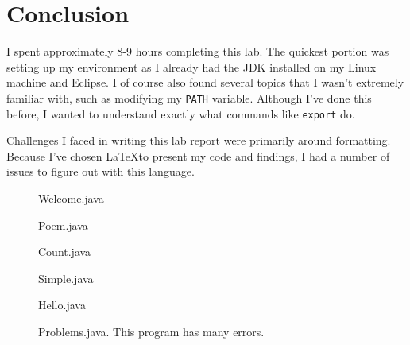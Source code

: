 \documentclass[leqno, 11pt]{article}
\begin{document}
\section*{Conclusion}
I spent approximately 8-9 hours completing this lab. The quickest portion was setting up my environment as I already had the JDK installed on my Linux machine and Eclipse. I of course also found several topics that I wasn't extremely familiar with, such as modifying my \texttt{PATH} variable. Although I've done this before, I wanted to understand exactly what commands like \texttt{export} do. 

Challenges I faced in writing this lab report were primarily around formatting. Because I've chosen \LaTeX to present my code and findings, I had a number of issues to figure out with this language.

\newpage

\begin{figure}[t!]
  \centering
  
  \caption{Welcome.java}
  \label{fig:one}
\end{figure}

\begin{figure}[t!]
  \centering
  
  \caption{Poem.java}
  \label{fig:two}
\end{figure}

\begin{figure}
  \centering
  
  \caption{Count.java}
  \label{fig:three}
\end{figure}

\newpage

\begin{figure}
  \centering
  
  \caption{Simple.java}
  \label{fig:four}
\end{figure}

\begin{figure}
  \centering
  
  \caption{Hello.java}
  \label{fig:five}
\end{figure}

\begin{figure}
  \centering
  
  \caption{Problems.java. This program has many errors.}
  \label{fig:six}
\end{figure}
\end{document}
